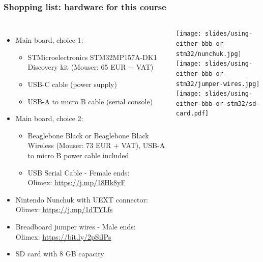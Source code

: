 \begin{frame}
\frametitle{Shopping list: hardware for this course}
  \begin{columns}
    \footnotesize
    \begin{itemize}
      \item Main board, choice 1:
      \begin{itemize}
        \item STMicroelectronics STM32MP157A-DK1 Discovery kit
        (Mouser: 65 EUR + VAT)
        \item USB-C cable (power supply)
        \item USB-A to micro B cable (serial console)
      \end{itemize}
      \item Main board, choice 2:
      \begin{itemize}
        \item Beaglebone Black or Beaglebone Black Wireless
        (Mouser: 73 EUR + VAT), USB-A to micro B power cable included
        \item USB Serial Cable - Female ends: \\
        Olimex: \url{https://j.mp/18Hk8yF}
      \end{itemize}
      \item Nintendo Nunchuk with UEXT connector: \\
            Olimex: \url{https://j.mp/1dTYLfs}
      \item Breadboard jumper wires - Male ends: \\
            Olimex: \url{https://bit.ly/2pSiIPs}
      \item SD card with 8 GB capacity
    \end{itemize}
    \texttt{[image: slides/using-either-bbb-or-stm32/nunchuk.jpg]} \\
    \vspace{1cm}
    \texttt{[image: slides/using-either-bbb-or-stm32/jumper-wires.jpg]} \\
    \vspace{1cm}
    \texttt{[image: slides/using-either-bbb-or-stm32/sd-card.pdf]}
  \end{columns}
\end{frame}
